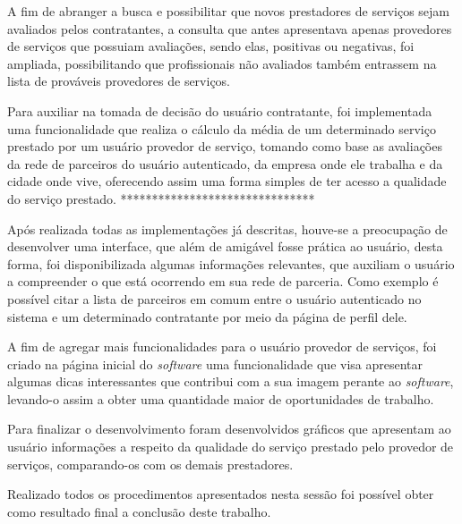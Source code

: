 \par A fim de abranger a busca e possibilitar que novos prestadores de serviços sejam avaliados pelos contratantes, a consulta que antes apresentava apenas provedores de serviços que possuiam avaliações, sendo elas, positivas ou negativas, foi ampliada, possibilitando que profissionais não avaliados também entrassem na lista de prováveis provedores de serviços.

\par Para auxiliar na tomada de decisão do usuário contratante, foi implementada uma funcionalidade que realiza o cálculo da média de um determinado serviço prestado por um usuário provedor de serviço, tomando como base as avaliações da rede de parceiros do usuário autenticado, da empresa onde ele trabalha e da cidade onde vive, oferecendo assim uma forma simples de ter acesso a qualidade do serviço prestado. *******************************

\par Após realizada todas as implementações já descritas, houve-se a preocupação de desenvolver uma interface, que além de amigável fosse prática ao usuário, desta forma, foi disponibilizada algumas informações relevantes, que auxiliam o usuário a compreender o que está ocorrendo em sua rede de parceria. Como exemplo é possível citar a lista de parceiros em comum entre o usuário autenticado no sistema e um determinado contratante por meio da página de perfil dele.

\par A fim de agregar mais funcionalidades para o usuário provedor de serviços, foi criado na página inicial do \textit{software} uma funcionalidade que visa apresentar algumas dicas interessantes que contribui com a sua imagem perante ao \textit{software}, levando-o assim a obter uma quantidade maior de oportunidades de trabalho.

\par Para finalizar o desenvolvimento foram desenvolvidos gráficos que apresentam ao usuário informações a respeito da qualidade do serviço prestado pelo provedor de serviços, comparando-os com os demais prestadores.

\par Realizado todos os procedimentos apresentados nesta sessão foi possível obter como resultado final a conclusão deste trabalho.